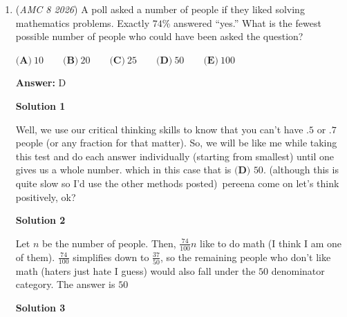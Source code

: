 \begin{enumerate}
 



\textbf{Solution 3}

Start with combining the battery fractions listed in the problem, and we compare that to the number of miles she rode.

 $\frac{1}{2} + \frac{3}{10} = \frac{8}{10}$

 So $40$ miles is $\frac{8}{10}$ of her battery power.

 
 \[\frac{8}{10}x = 40\]

 Multiply both sides by $\frac{10}{8}$:

 
 \[\frac{10}{8} \cdot \frac{8}{10}x = 40 \cdot \frac{10}{8}\]

 \[x = \frac{400}{8}\]

 The answer is $\boxed{50}$.

 


	\item (\textit{AMC 8 2026}) A poll asked a number of people if they liked solving mathematics problems. Exactly $74$\% answered “yes.” What is the fewest possible number of people who could have been asked the question?


 $\textbf{(A)}\ 10 \qquad \textbf{(B)}\ 20 \qquad \textbf{(C)}\ 25 \qquad \textbf{(D)}\ 50 \qquad \textbf{(E)}\ 100$

 \textbf{Answer: }D



\textbf{Solution 1}

Well, we use our critical thinking skills to know that you can’t have .$5$ or .$7$ people (or any fraction for that matter). So, we will be like me while taking this test and do each answer individually (starting from smallest) until one gives us a whole number. which in this case that is $\boxed{ \textbf{(D) } 50}$. (although this is quite slow so I’d use the other methods posted)~pereena come on let's think positively, ok?

 



\textbf{Solution 2}

Let $n$ be the number of people. Then, $\frac{74}{100} n$ like to do math (I think I am one of them). $\frac{74}{100}$ simplifies down to $\frac{37}{50}$, so the remaining people who don't like math (haters just hate I guess) would also fall under the $50$ denominator category. The answer is $\boxed{50}$




\textbf{Solution 3}


\end{enumerate}
